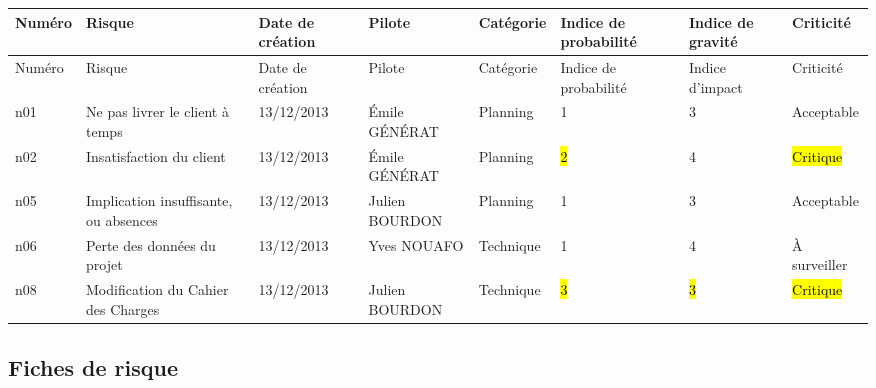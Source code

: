 \documentclass[a4paper,11pt,french]{article}
\begin{document}
\begin{landscape}

\begin{longtable}{|m{1.5cm}|m{4cm}|m{3cm}|m{3.2cm}|m{2.2cm}|m{2cm}|m{2cm}|m{2.2cm}|}
\hline
\rowcolor[gray]{.8}
Numéro & Risque & Date de création & Pilote & Catégorie \footnotemark[1] & Indice de probabilité & Indice de gravité & Criticité \footnotemark[2] \\ 
\hline
\endfirsthead
\hline
\rowcolor[gray]{.8}
Numéro & Risque & Date de création & Pilote & Catégorie \footnotemark[1] & Indice de probabilité & Indice d'impact & Criticité \footnotemark[2] \\ 
\hline

\endhead
n01 & Ne pas livrer le client à temps & 13/12/2013 & Émile GÉNÉRAT & Planning & 1 & 3 & Acceptable \\
\hline
n02 & Insatisfaction du client & 13/12/2013 & Émile GÉNÉRAT & Planning & \hl{2} & 4 &  \hl{Critique}\\
\hline
n05 & Implication insuffisante, ou absences & 13/12/2013 & Julien BOURDON & Planning & 1 & 3 & Acceptable \\
\hline
n06 & Perte des données du projet & 13/12/2013 & Yves NOUAFO & Technique & 1 & 4 & À surveiller \\
\hline
n08 & Modification du Cahier des Charges & 13/12/2013 & Julien BOURDON & Technique & \hl{3} & \hl{3} & \hl{Critique} \\
\hline

\end{longtable}

\end{landscape}

\newpage

\subsection{Fiches de risque}
\end{document}
